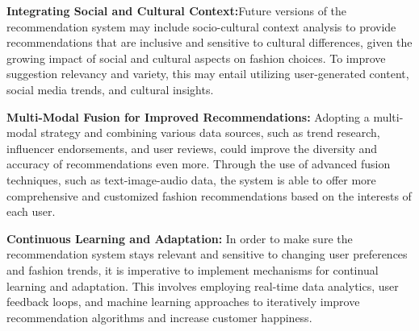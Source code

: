 \documentclass[conference]{IEEEtran}
\begin{document}
\textbf{Integrating Social and Cultural Context:}Future versions of the recommendation system may include socio-cultural context analysis to provide recommendations that are inclusive and sensitive to cultural differences, given the growing impact of social and cultural aspects on fashion choices. To improve suggestion relevancy and variety, this may entail utilizing user-generated content, social media trends, and cultural insights.

\textbf{Multi-Modal Fusion for Improved Recommendations:} Adopting a multi-modal strategy and combining various data sources, such as trend research, influencer endorsements, and user reviews, could improve the diversity and accuracy of recommendations even more. Through the use of advanced fusion techniques, such as text-image-audio data, the system is able to offer more comprehensive and customized fashion recommendations based on the interests of each user.


\textbf{Continuous Learning and Adaptation:} In order to make sure the recommendation system stays relevant and sensitive to changing user preferences and fashion trends, it is imperative to implement mechanisms for continual learning and adaptation. This involves employing real-time data analytics, user feedback loops, and machine learning approaches to iteratively improve recommendation algorithms and increase customer happiness. 
\end{document}
